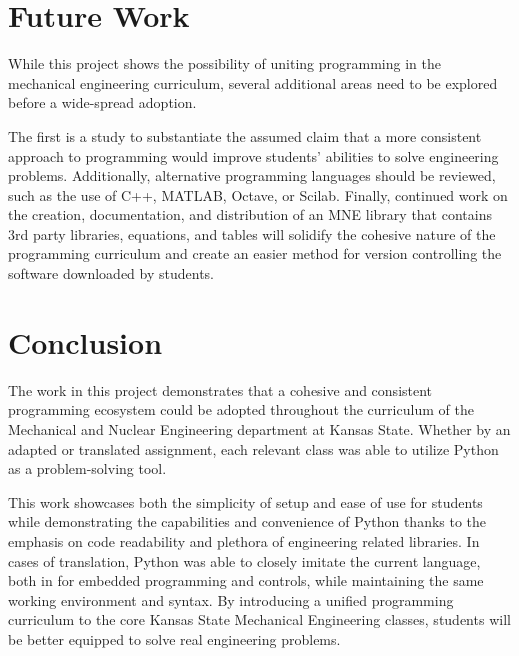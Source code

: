 \section{Future Work}

While this project shows the possibility of uniting programming in the mechanical 
engineering curriculum, several additional areas need to be explored before a 
wide-spread adoption. 

The first is a study to substantiate the assumed claim that a more 
consistent approach to programming would improve students' abilities to solve
engineering problems. Additionally, alternative programming languages should be
reviewed, such as the use of C++, MATLAB, Octave, or Scilab. 
Finally, continued work on the creation, documentation, and distribution
of an MNE library that contains 3rd party libraries, equations, and tables
will solidify the cohesive nature of the programming curriculum and create an
easier method for version controlling the software downloaded by students.

\section{Conclusion}

The work in this project demonstrates that a cohesive and consistent programming 
ecosystem could be adopted throughout the curriculum of the Mechanical and 
Nuclear Engineering department at Kansas State. Whether by an adapted or translated
assignment, each relevant class was able to utilize Python as a problem-solving 
tool. 

This work showcases both the simplicity of setup and ease of use for students
while demonstrating the capabilities and convenience of Python thanks to the 
emphasis on code readability and plethora of engineering related libraries.
In cases of translation, Python was able to closely imitate the current language,
both in for embedded programming and controls, while maintaining the same 
working environment and syntax. By introducing a unified programming curriculum
to the core Kansas State Mechanical Engineering classes, students will be better
equipped to solve real engineering problems.

